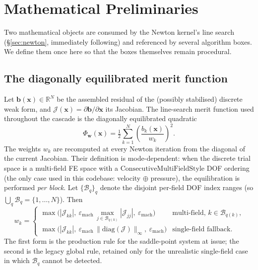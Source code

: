 \documentclass{article}
\begin{document}
\section{Mathematical Preliminaries}
\label{sec:math-prelim}

Two mathematical objects are consumed by the Newton kernel's line search
(§\ref{sec:newton}, immediately following) and referenced by several
algorithm boxes. We define them once here so that the boxes themselves
remain procedural.

\subsection{The diagonally equilibrated merit function}
\label{sec:merit}

Let $\boldsymbol{b}(\boldsymbol{x}) \in \mathbb{R}^N$ be the assembled
residual of the (possibly stabilised) discrete weak form, and
$\mathcal{J}(\boldsymbol{x}) = \partial \boldsymbol{b}/\partial \boldsymbol{x}$
its Jacobian. The line-search merit function used throughout the
cascade is the diagonally equilibrated quadratic
\begin{equation}
    \label{eq:merit}
    \Phi_{\boldsymbol{w}}(\boldsymbol{x})
        = \tfrac{1}{2} \sum_{k=1}^{N}
            \left( \frac{b_k(\boldsymbol{x})}{w_k} \right)^{2}.
\end{equation}
The weights $w_k$ are recomputed at every Newton iteration from the
diagonal of the current Jacobian. Their definition is mode-dependent:
when the discrete trial space is a multi-field FE space with a
$\mathrm{ConsecutiveMultiFieldStyle}$ DOF ordering (the only case used
in this codebase: velocity $\oplus$ pressure), the equilibration is
performed \emph{per block}. Let $\{\mathcal{B}_q\}_{q}$ denote the
disjoint per-field DOF index ranges (so $\bigcup_q \mathcal{B}_q
= \{1,\dots,N\}$). Then
\begin{equation}
    \label{eq:merit-weights}
    w_k =
    \begin{cases}
        \max\!\bigl(|\mathcal{J}_{kk}|,\ \varepsilon_{\mathrm{mach}}\,
            \max_{j \in \mathcal{B}_{q(k)}} |\mathcal{J}_{jj}|,\
            \varepsilon_{\mathrm{mach}} \bigr)
            & \text{multi-field, $k \in \mathcal{B}_{q(k)}$,} \\[1mm]
        \max\!\bigl(|\mathcal{J}_{kk}|,\ \varepsilon_{\mathrm{mach}}\,
            \|\mathrm{diag}(\mathcal{J})\|_\infty,\
            \varepsilon_{\mathrm{mach}} \bigr)
            & \text{single-field fallback.}
    \end{cases}
\end{equation}
The first form is the production rule for the saddle-point system at
issue; the second is the legacy global rule, retained only for the
unrealistic single-field case in which $\mathcal{B}_q$ cannot be
detected.
\end{document}
